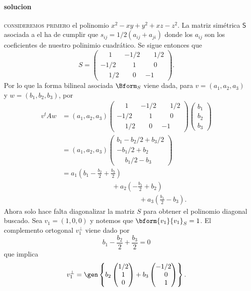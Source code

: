 \paragraph{solucion}
	\textsc{consideremos primero} el polinomio $x^2-xy+y^2+xz-z^2$. La matriz simétrica $\mathsf S$ asociada a el ha de cumplir que $s_{ij}=1/2(a_{ij}+a_{ji})$ donde los $a_{ij}$ son los coeficientes de nuestro polinimio cuadrático. Se sigue entonces que
	\[ S = \begin{pmatrix}
	\phantom{-}1 & -1/2 & \phantom{-}1/2 \\
	-1/2 & \phantom{-}1 & \phantom{-}0 \\
	\phantom{-}1/2 & \phantom{-}0 & -1
	\end{pmatrix}. \]
	Por lo que la forma bilineal asociada $\Bform_S$ viene dada, para $v=(a_1,a_2,a_3)$ y $w=(b_1,b_2,b_3)$, por
	\begin{align*}
	v^tAw &= (a_1,a_2,a_3) \begin{pmatrix}
	\phantom{-}1 & -1/2 & \phantom{-}1/2 \\
	-1/2 & \phantom{-}1 & \phantom{-}0 \\
	\phantom{-}1/2 & \phantom{-}0 & -1
	\end{pmatrix} \begin{pmatrix}
	b_1 \\ b_2 \\ b_3
	\end{pmatrix} \\
	&= (a_1,a_2,a_3) \begin{pmatrix}
	b_1-b_2/2+b_3/2 \\
	-b_1/2+b_2 \\
	\phantom{-}b_1/2 - b_3
	\end{pmatrix} \\
	&= a_1(b_1-\frac{b_2}{2}+\frac{b_3}{2}) \\
	&\phantom{=}\hspace{6em}+ a_2(-\frac{b_1}{2}+b_2) \\
	&\phantom{=}\hspace{10em}+ a_3(\frac{b_1}{2} - b_3). 
	\end{align*}
	Ahora solo hace falta diagonalizar la matriz $S$ para obtener el polinomio diagonal buscado. Sea $v_1 = (1,0,0)$ y notemos que $\bform{v_1}{v_1}_S = 1$. El complemento ortogonal $v_1^\perp$ viene dado por
	\[ b_1-\frac{b_2}{2}+\frac{b_3}{2} = 0 \]
	que implica
	\[ v_1^\perp = \gen\left\{ b_2\begin{pmatrix}
	1/2 \\ 1 \\ 0
	\end{pmatrix} + b_3\begin{pmatrix}
	-1/2 \\ \phantom{-}0 \\ \phantom{-}1
	\end{pmatrix} \right\}. \]
